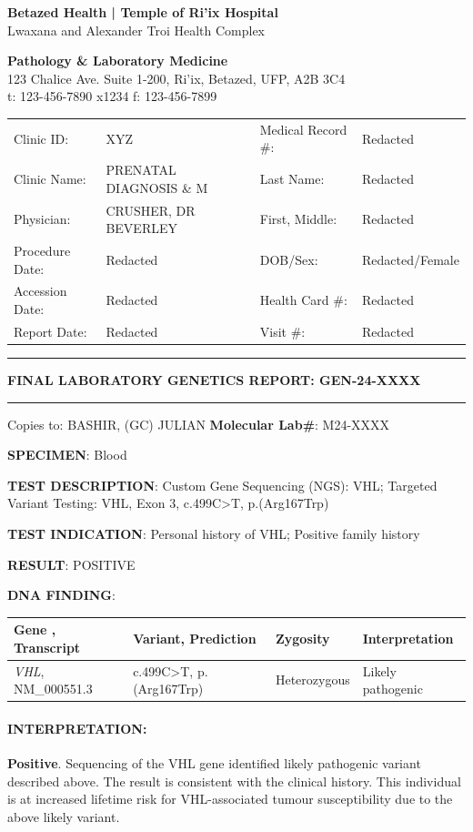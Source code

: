 \documentclass[10pt]{extarticle}
\begin{document}
\parbox[t][][]{.38\textwidth}{
{\large \bf Betazed Health | Temple of Ri'ix Hospital}\\
Lwaxana and Alexander Troi Health Complex
}
\hfill
\parbox[t][][]{.55\textwidth}{
{\large \bf Pathology \& Laboratory Medicine }\\
{\scriptsize 123 Chalice Ave. Suite 1-200, Ri'ix, Betazed, UFP, A2B 3C4 \\
t: 123-456-7890 x1234 f: 123-456-7899}
}

\begin{tabular}{l l l l}
Clinic ID: & XYZ & Medical Record \#:& Redacted \\
Clinic Name: & PRENATAL DIAGNOSIS \& M & Last Name:& Redacted \\
Physician: & CRUSHER, DR BEVERLEY & First, Middle:& Redacted\\
Procedure Date: & Redacted& DOB/Sex: & Redacted/Female \\
Accession Date: & Redacted & Health Card \#:&  Redacted \\
Report Date: & Redacted & Visit \#:&  Redacted \\
\end{tabular}

\vspace{1em}
\rule{\textwidth}{1pt}

{\Large \bf FINAL LABORATORY GENETICS REPORT: \hfill GEN-24-XXXX}
\rule{\textwidth}{1pt}


Copies to: BASHIR, (GC) JULIAN \hfill {\bf Molecular Lab\#}: M24-XXXX

{\bf SPECIMEN}: Blood

{\bf TEST DESCRIPTION}: Custom Gene Sequencing (NGS): VHL; Targeted Variant Testing: VHL, Exon 3, c.499C>T, p.(Arg167Trp)

{\bf TEST INDICATION}: Personal history of VHL; Positive family history

{\bf RESULT}: POSITIVE

{\bf DNA FINDING}:\\ 
\begin{tabular}{ | l | l | l | l | }
\hline
{\bf Gene , Transcript} & {\bf Variant, Prediction} & {\bf Zygosity} & {\bf Interpretation} \\ \hline
{\it VHL}, NM\_000551.3 & c.499C>T, p.(Arg167Trp) & Heterozygous & Likely pathogenic \\ \hline
\end{tabular}

\paragraph{INTERPRETATION:} {\bf Positive}. Sequencing of the VHL gene identified likely pathogenic variant described above.
The result is consistent with the clinical history. This individual is at increased lifetime risk for VHL-associated tumour susceptibility due to the above likely variant.
\end{document}
